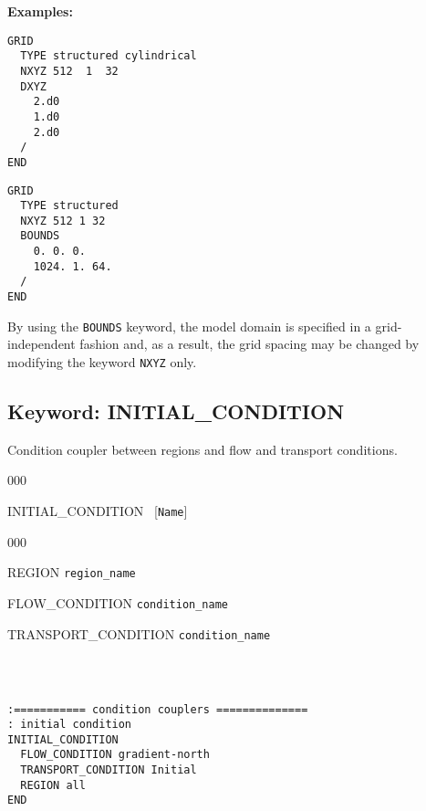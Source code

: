 \begin{mdframed}

\noindent
{\bf Examples:}
\begin{verbatim}
GRID
  TYPE structured cylindrical
  NXYZ 512  1  32
  DXYZ
    2.d0
    1.d0
    2.d0
  /
END
\end{verbatim}

\begin{verbatim}
GRID
  TYPE structured
  NXYZ 512 1 32
  BOUNDS
    0. 0. 0.
    1024. 1. 64.
  /
END
\end{verbatim}
\end{mdframed}

\noindent
By using the {\tt BOUNDS} keyword, the model domain is specified in a grid-independent fashion and, as a result, the grid spacing may be changed by modifying the keyword {\tt NXYZ} only.

\hyperlink{target_key}{\return}

\hyperlink{target_input_file}{\returnb}


\newpage
\protect\hypertarget{target_init}{}

\subsection{Keyword: INITIAL\_CONDITION}

 Condition coupler between regions and flow and transport conditions.

\begin{deflist}{000}
\item[INITIAL\_CONDITION] \ [{\tt Name}]
\begin{deflist}{000}
\item[REGION] {\tt region\_name}
\item[FLOW\_CONDITION] {\tt condition\_name}
\item[TRANSPORT\_CONDITION] {\tt condition\_name}
\end{deflist}
\item[\keyend] ~
\end{deflist}


\begin{mdframed}


\begin{verbatim}

:=========== condition couplers ==============
: initial condition
INITIAL_CONDITION
  FLOW_CONDITION gradient-north
  TRANSPORT_CONDITION Initial
  REGION all
END
\end{verbatim}
\end{mdframed}

